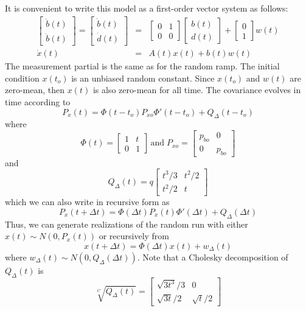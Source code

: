 It is convenient to write this model as a first-order vector system as follows:
\begin{eqnarray}
	\begin{bmatrix} \dot{b}(t) \\ \ddot{b}(t) \end{bmatrix} =
	\begin{bmatrix} \dot{b}(t) \\ \dot{d}(t) \end{bmatrix} &=&
	\begin{bmatrix} 0 & 1 \\ 0 & 0 \end{bmatrix}
	\begin{bmatrix} b(t) \\ d(t) \end{bmatrix} +
	\begin{bmatrix} 0 \\ 1 \end{bmatrix} w(t) \\
	\dot{x}(t) &=& A(t) x(t) + b(t) w(t)
\end{eqnarray}
The measurement partial is the same as for the random ramp.  The initial condition $x(t_o)$ is an unbiased random constant.  Since $x(t_o)$ and $w(t)$ are zero-mean, then $x(t)$ is also zero-mean for all time.  The covariance evolves in time according to
\begin{equation}
	P_x(t) = \Phi(t-t_o)P_{xo}\Phi'(t-t_o) + Q_\Delta(t-t_o)
\end{equation}
where
\begin{equation}
	\Phi(t) = \begin{bmatrix} 1 & t \\ 0 & 1 \end{bmatrix} \, \text{and} \;
	P_{xo} = \begin{bmatrix} p_{bo} & 0 \\ 0 & p_{\dot{b}o} \end{bmatrix}
\end{equation}
and
\begin{equation}
	Q_\Delta(t) = q\begin{bmatrix} t^3/3 & t^2/2 \\ t^2/2 & t \end{bmatrix}
\end{equation}
which we can also write in recursive form as
\begin{equation}
	P_x(t+\Delta t) = \Phi(\Delta t)P_x(t)\Phi'(\Delta t) + Q_\Delta(\Delta t)
\end{equation}
Thus, we can generate realizations of the random run with either $x(t) \sim N(0, P_x(t))$ or recursively from
\begin{equation}
	x(t+\Delta t) = \Phi(\Delta t) x(t) + w_\Delta(t)
\end{equation}
where $w_\Delta(t) \sim N(0, Q_\Delta(\Delta t))$.  Note that a Cholesky decomposition of $Q_\Delta(t)$ is
\begin{equation}
	\sqrt[C]{Q_\Delta(t)} = \begin{bmatrix} \sqrt{3t^3}/3 & 0 \\ \sqrt{3t}/2 & \sqrt{t}/2 \end{bmatrix}
\end{equation}

